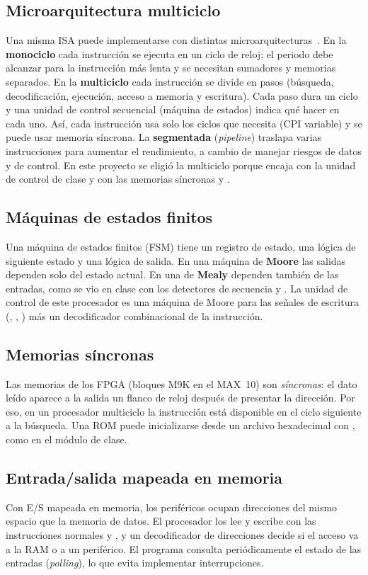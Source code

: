 \documentclass[12pt,letterpaper]{article}
\begin{document}
\subsection{Microarquitectura multiciclo}
Una misma ISA puede implementarse con distintas microarquitecturas~\cite{harris,patterson}. En
la \textbf{monociclo} cada instrucción se ejecuta en un ciclo de reloj; el periodo debe
alcanzar para la instrucción más lenta y se necesitan sumadores y memorias separados. En la
\textbf{multiciclo} cada instrucción se divide en pasos (búsqueda, decodificación, ejecución,
acceso a memoria y escritura). Cada paso dura un ciclo y una unidad de control secuencial
(máquina de estados) indica qué hacer en cada uno. Así, cada instrucción usa solo los ciclos que
necesita (CPI variable) y se puede usar memoria síncrona. La \textbf{segmentada}
(\emph{pipeline}) traslapa varias instrucciones para aumentar el rendimiento, a cambio de manejar
riesgos de datos y de control. En este proyecto se eligió la multiciclo porque encaja con la
unidad de control  de clase y con las memorias síncronas  y
.

\subsection{Máquinas de estados finitos}
Una máquina de estados finitos (FSM) tiene un registro de estado, una lógica de siguiente estado
y una lógica de salida. En una máquina de \textbf{Moore} las salidas dependen solo del estado
actual. En una de \textbf{Mealy} dependen también de las entradas, como se vio en clase con los
detectores de secuencia  y . La unidad de control de este
procesador es una máquina de Moore para las señales de escritura (,
, ) más un decodificador combinacional de la instrucción.

\subsection{Memorias síncronas}
Las memorias de los FPGA (bloques M9K en el MAX~10) son \emph{síncronas}: el dato leído aparece
a la salida un flanco de reloj después de presentar la dirección. Por eso, en un procesador
multiciclo la instrucción está disponible en el ciclo siguiente a la búsqueda. Una ROM puede
inicializarse desde un archivo hexadecimal con , como en el módulo
 de clase.

\subsection{Entrada/salida mapeada en memoria}
Con E/S mapeada en memoria, los periféricos ocupan direcciones del mismo espacio que la memoria
de datos. El procesador los lee y escribe con las instrucciones normales  y , y
un decodificador de direcciones decide si el acceso va a la RAM o a un periférico. El programa
consulta periódicamente el estado de las entradas (\emph{polling}), lo que evita implementar
interrupciones.
\end{document}
